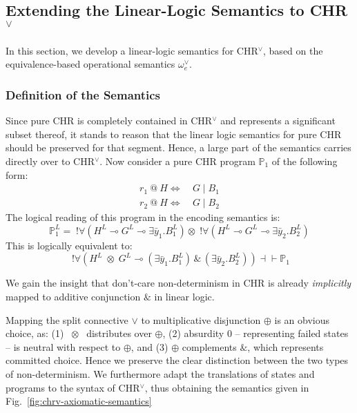 \documentclass[acmtocl]{acmtrans2m}
\newcommand{\oesqv}{\ensuremath{\omega^\vee_e}}
\newcommand{\bbP}{\ensuremath{\mathbb{P}}}
\newcommand{\by}{\bar{y}}
\newcommand{\chrv}{CHR$^\vee$}
\newcommand{\x}{{\;\otimes\;}}
\newcommand{\lp}{\multimap}
\newcommand{\bang}{\; !}
\newcommand{\with}{\,\&\,}
\begin{document}
\subsection{Extending the Linear-Logic Semantics to \chrv}
\label{sec:vee-extend}

In this section, we develop a linear-logic semantics for CHR$^\vee$, based on
the equivalence-based operational semantics $\oesqv$.

\subsubsection{Definition of the Semantics}

Since pure CHR is completely contained in CHR$^\vee$ and represents a
significant subset thereof, it stands to reason that the linear logic semantics
for pure CHR should be preserved for that segment. Hence, a large part of the
semantics carries directly over to CHR$^\vee$. Now consider a pure CHR program
$\bbP_1$ of the following form:
\begin{align*}
  r_1\ @\ H \Leftrightarrow~& G \mid B_1 \\
  r_2\ @\ H \Leftrightarrow~& G \mid B_2
\end{align*}
The logical reading of this program in the encoding semantics is:
\[
\bbP_1^L =
\bang\forall\left(H^L\lp G^L\lp \exists\by_1.B_1^L\right) \otimes
\bang\forall\left(H^L\lp G^L\lp \exists\by_2.B_2^L\right)
\]
This is logically equivalent to:
\[
	\bang\forall\left(H^L\x G^L\lp
    (\exists\by_1.B_1^L) \with
    (\exists\by_2.B_2^L) \right) \dashv\vdash \bbP_1
\]

We gain the insight that don't-care non-determinism in CHR is already
\emph{implicitly} mapped to additive conjunction $\&$ in linear logic.

Mapping the split connective $\vee$ to multiplicative disjunction $\oplus$ is
an obvious choice, as: (1) $\x$ distributes over $\oplus$, (2)
absurdity 0 -- representing failed states -- is neutral with respect to
$\oplus$, and (3) $\oplus$ complements $\&$, which represents committed choice.
Hence we preserve the clear distinction between the two types of
non-determinism. We furthermore adapt the translations of states and programs to
the syntax of CHR$^\vee$, thus obtaining the semantics given in
Fig.~\ref{fig:chrv-axiomatic-semantics}
\end{document}
